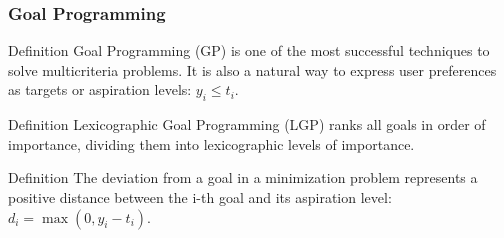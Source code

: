 \begin{frame} 
\frametitle{Goal Programming}
	\begin{block}{Definition}
	\vspace{1mm}
		Goal Programming (GP) is one of the \textcolor{ao}{most successful techniques} to solve multicriteria problems. It is also a \textcolor{ao}{natural way to express user preferences} as targets or aspiration levels: $y_i \leq t_i$.
	\vspace{1mm}	
	\end{block}
	\vspace{2mm}
	\begin{block}{Definition}
	\vspace{1mm}
		Lexicographic Goal Programming (LGP) \textcolor{ao}{ranks all goals in order of importance}, dividing them into lexicographic levels of importance.
	\vspace{1mm}
	\end{block}
	\vspace{2mm}
	\begin{block}{Definition}
	\vspace{1mm}
		The deviation from a goal in a minimization problem represents a \textcolor{ao}{positive distance} between the i-th goal and its aspiration level: $d_i = \max(0, y_i - t_i)$.
	\vspace{1mm}
	\end{block}
\note{}
\end{frame}
